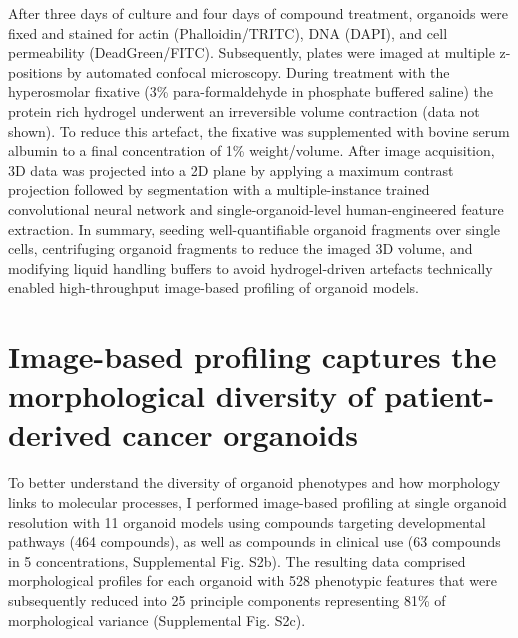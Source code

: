 \begin{flushleft}
\bigbreak

After three days of culture and four days of compound treatment, organoids were fixed and stained for actin (Phalloidin/TRITC), DNA (DAPI), and cell permeability (DeadGreen/FITC). Subsequently, plates were imaged at multiple z-positions by automated confocal microscopy. During treatment with the hyperosmolar fixative (3\% para-formaldehyde in phosphate buffered saline) the protein rich hydrogel underwent an irreversible volume contraction (data not shown). To reduce this artefact, the fixative was supplemented with bovine serum albumin to a final concentration of 1\% weight/volume. After image acquisition, 3D data was projected into a 2D plane by applying a maximum contrast projection followed by segmentation with a multiple-instance trained convolutional neural network and single-organoid-level human-engineered feature extraction. In summary, seeding well-quantifiable organoid fragments over single cells, centrifuging organoid fragments to reduce the imaged 3D volume, and modifying liquid handling buffers to avoid hydrogel-driven artefacts technically enabled high-throughput image-based profiling of organoid models. 

\section{Image-based profiling captures the morphological diversity of patient-derived cancer organoids}

To better understand the diversity of organoid phenotypes and how morphology links to molecular processes, I performed image-based profiling at single organoid resolution with 11 organoid models using compounds targeting developmental pathways (464 compounds), as well as compounds in clinical use (63 compounds in 5 concentrations, Supplemental Fig. S2b). The resulting data comprised morphological profiles for each organoid with 528 phenotypic features that were subsequently reduced into 25 principle components representing 81\% of morphological variance (Supplemental Fig. S2c).

\bigbreak


\end{flushleft}
